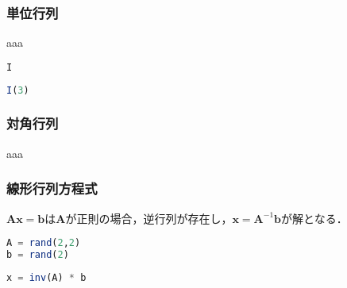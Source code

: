 \subsubsection{単位行列}
aaa
\begin{lstlisting}[language=julia]
I
\end{lstlisting}
\begin{lstlisting}[language=julia]
I(3)
\end{lstlisting}
\subsubsection{対角行列}
aaa
\subsubsection{線形行列方程式}
$\mathbf{A}\mathbf{x}=\mathbf{b}$は$\mathbf{A}$が正則の場合，逆行列が存在し，$\mathbf{x}=\mathbf{A}^{-1}\mathbf{b}$が解となる．
\begin{lstlisting}[language=julia]
A = rand(2,2)
b = rand(2)
\end{lstlisting}
\begin{lstlisting}[language=julia]
x = inv(A) * b
\end{lstlisting}
